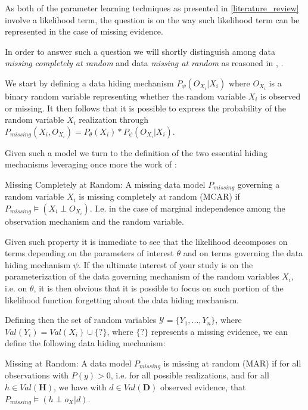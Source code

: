 \documentclass[11pt]{article}
\begin{document}
\begin{article}
As both of the parameter learning techniques as presented in
\ref{literature_review} involve a likelihood term, the question is on
the way such likelihood term can be represented in the case of
missing evidence.

In order to answer such a question we will shortly distinguish among
data \emph{missing completely at random} and data \emph{missing at random} as
reasoned in \cite{little1976inference}, \cite{rubin1976inference}.

We start by defining a data hiding mechanism \(P_\psi(O_{X_i}|X_i)\) where
\(O_{X_i}\) is a binary random variable representing whether the
random variable \(X_i\) is observed or missing. It then follows that
it is possible to express the probability of the random variable
\(X_i\) realization through \(P_{missing}(X_i, O_{X_i}) = P_{\theta}(X_i) *
  P_\psi(O_{X_i}|X_i)\).

Given such a model we turn to the definition of the two essential
hiding mechanisms leveraging once more the work of \cite{koller2009probabilistic}:

\begin{definition}
Missing Completely at Random: A missing data model $P_{missing}$ governing a
random variable $X_i$ is missing
completely at random (MCAR) if $P_{missing} \models (X_i \perp O_{X_i})$.
I.e. in the case of marginal independence among the observation mechanism
and the random variable.
\end{definition}  

Given such property it is immediate to see that the likelihood
decomposes on terms depending on the parameters of interest \(\theta\)
and on terms governing the data hiding mechanism \(\psi\). If the
ultimate interest of your study is on the parameterization of the
data governing mechanism of the random variables \(X_i\), i.e. on
\(\theta\), it is then obvious that it is possible to focus on such
portion of the likelihood function forgetting about the data hiding
mechanism.

Defining then the set of random variables \(\mathscr{Y} = \{Y_1, . . . , Y_n\}\),
where \(Val(Y_i) = Val(X_i) \cup \{?\}\), where \(\{?\}\) represents a
missing evidence, we can define the following data hiding mechanism:

\begin{definition}
Missing at Random: A data model $P_{missing}$ is missing at random (MAR)
if for all observations with $P(y) > 0$, i.e. for all possible realizations,
and for all $h \in Val(\textbf{H})$, we have with $d \in Val(\textbf{D})$
observed evidence, that $ P_{missing} \models (h \perp o_{X} | d) $.
\end{definition}  


\end{article}
\end{document}
